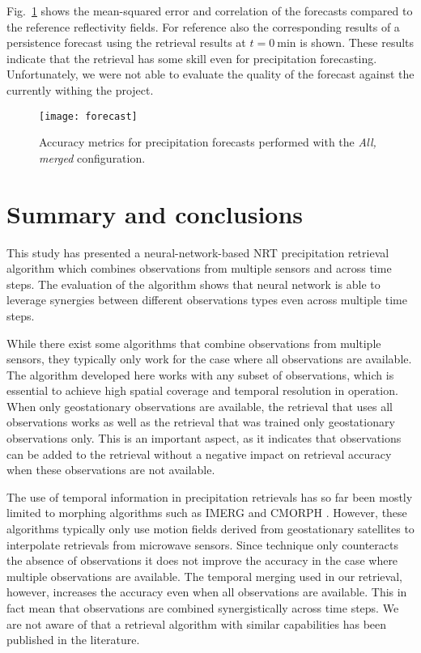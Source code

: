 \documentclass[11pt]{scrartcl}
\begin{document}
 Fig.~\ref{fig:forecast} shows the mean-squared error and correlation of the
 forecasts compared to the reference reflectivity fields. For reference also the
 corresponding results of a persistence forecast using the retrieval results at
 $t = \SI{0}{\minute}$ is shown. These results indicate that the retrieval has
 some skill even for precipitation forecasting. Unfortunately, we were not able
 to evaluate the quality of the forecast against the currently withing the
 project.

\begin{figure}
  \centering
  \texttt{[image: forecast]}
  \caption{
    Accuracy metrics for precipitation forecasts performed with the \textit{All, merged}
    configuration.
  }
  \label{fig:forecast}
\end{figure}

\section{Summary and conclusions}
\label{sec:org5e185c2}

This study has presented a neural-network-based NRT precipitation retrieval
algorithm which combines observations from multiple sensors and across time
steps. The evaluation of the algorithm shows that neural network is able to
leverage synergies between different observations types even across multiple
time steps.

While there exist some algorithms that combine observations from multiple
sensors, they typically only work for the case where all observations are
available. The algorithm developed here works with any subset of observations,
which is essential to achieve high spatial coverage and temporal resolution in
operation. When only geostationary observations are available, the retrieval
that uses all observations works as well as the retrieval that was trained only
geostationary observations only. This is an important aspect, as it indicates
that observations can be added to the retrieval without a negative impact
on retrieval accuracy when these observations are not available.

The use of temporal information in precipitation retrievals has so far
been mostly limited to morphing algorithms such as IMERG \citep{huffman20} and
CMORPH \citep{joyce11}. However, these algorithms typically only use motion
fields derived from  geostationary satellites to interpolate retrievals
from microwave sensors. Since technique only counteracts the absence of
observations it does not improve the accuracy in the case where multiple
observations are available. The temporal merging used in our retrieval,
however, increases the accuracy even when all observations are available.
This in fact mean that observations are combined synergistically across
time steps. We are not aware of that a retrieval algorithm with similar
capabilities has been published in the literature.


\end{document}
